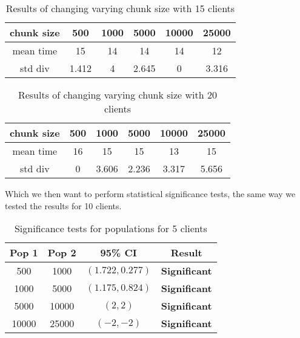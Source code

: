 \documentclass[a4paper, 12pt]{article}
\begin{document}
			
			\begin{table}[H]
				\begin{center}
					\begin{tabular}{ | c c c c c c |}
					\hline
					chunk size & 500 & 1000 & 5000 & 10000 & 25000\\
					\hline
					\hline
					mean time & 15 & 14 & 14 & 14 & 12\\
					std div & 1.412 & 4 & 2.645 & 0 & 3.316\\
					\hline
			
					\end{tabular}
					
					\caption{Results of changing varying chunk size with 15 clients}					
					
				\end{center}
			\end{table}
			
			
			\begin{table}[H]
				\begin{center}
					\begin{tabular}{ | c c c c c c |}
					\hline
					chunk size & 500 & 1000 & 5000 & 10000 & 25000\\
					\hline
					\hline
					mean time & 16 & 15 & 15 & 13 & 15\\
					std div & 0 & 3.606 & 2.236 & 3.317 & 5.656\\
					\hline
			
					\end{tabular}
					
					\caption{Results of changing varying chunk size with 20 clients}					
					
				\end{center}
			\end{table}
		
			
			Which we then want to perform statistical significance tests, the same way we tested the results for 10 clients.
			
			
			\begin{table}[H]
				\begin{center}
					\begin{tabular}{| c | c | c | c |}
						\hline
						Pop 1 & Pop 2 & 95\% CI & Result\\
						\hline
						500 & 1000 & $(1.722, 0.277)$ & \textbf{Significant}\\
						1000 & 5000 & $(1.175, 0.824)$ & \textbf{Significant} \\
						5000 & 10000 & $(2, 2)$ & \textbf{Significant} \\
						10000 & 25000 & $(-2, -2)$ & \textbf{Significant} \\
					
						\hline
					\end{tabular}
					
					\caption{Significance tests for populations for 5 clients}					
					
				\end{center}
			\end{table}				
			
\end{document}
